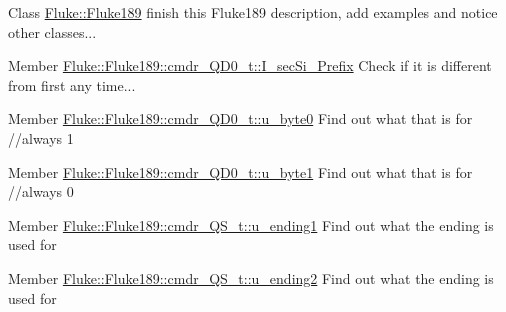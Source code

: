 \label{todo__todo000001}
\hypertarget{todo__todo000001}{}
 
\begin{DoxyDescription}
\item[Class \hyperlink{classFluke_1_1Fluke189}{Fluke::Fluke189} ]finish this Fluke189 description, add examples and notice other classes...


\end{DoxyDescription}

\label{todo__todo000014}
\hypertarget{todo__todo000014}{}
 
\begin{DoxyDescription}
\item[Member \hyperlink{structFluke_1_1Fluke189_1_1cmdr__QD0__t_a3bc502dcc711f5c308028b588e57e226}{Fluke::Fluke189::cmdr\_\-QD0\_\-t::I\_\-secSi\_\-Prefix} ]Check if it is different from first any time... 
\end{DoxyDescription}

\label{todo__todo000015}
\hypertarget{todo__todo000015}{}
 
\begin{DoxyDescription}
\item[Member \hyperlink{structFluke_1_1Fluke189_1_1cmdr__QD0__t_a8255c6d6c66768208d4a020146369013}{Fluke::Fluke189::cmdr\_\-QD0\_\-t::u\_\-byte0} ]Find out what that is for //always 1 
\end{DoxyDescription}

\label{todo__todo000016}
\hypertarget{todo__todo000016}{}
 
\begin{DoxyDescription}
\item[Member \hyperlink{structFluke_1_1Fluke189_1_1cmdr__QD0__t_a835768e5aabd53d41e1e7a4d10fdde1f}{Fluke::Fluke189::cmdr\_\-QD0\_\-t::u\_\-byte1} ]Find out what that is for //always 0 
\end{DoxyDescription}

\label{todo__todo000006}
\hypertarget{todo__todo000006}{}
 
\begin{DoxyDescription}
\item[Member \hyperlink{structFluke_1_1Fluke189_1_1cmdr__QS__t_ae5e99fd781866c32cdba484e15276d7a}{Fluke::Fluke189::cmdr\_\-QS\_\-t::u\_\-ending1} ]Find out what the ending is used for 
\end{DoxyDescription}

\label{todo__todo000007}
\hypertarget{todo__todo000007}{}
 
\begin{DoxyDescription}
\item[Member \hyperlink{structFluke_1_1Fluke189_1_1cmdr__QS__t_a08dec92163b6c7a734cdf4aa185d0875}{Fluke::Fluke189::cmdr\_\-QS\_\-t::u\_\-ending2} ]Find out what the ending is used for 
\end{DoxyDescription}

